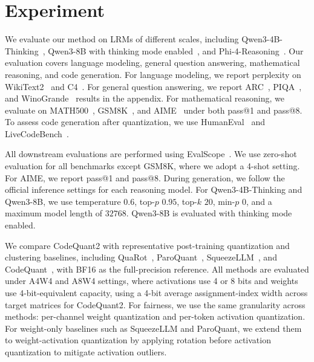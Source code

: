 \documentclass{article}
\begin{document}
\section{Experiment}
\label{sec:experiment}
We evaluate our method on LRMs of different scales, including Qwen3-4B-Thinking~\citep{yang2025qwen3}, Qwen3-8B with thinking mode enabled~\citep{yang2025qwen3}, and Phi-4-Reasoning~\citep{abdin2025phi4reasoningtechnicalreport}. Our evaluation covers language modeling, general question answering, mathematical reasoning, and code generation. For language modeling, we report perplexity on WikiText2~\citep{merity2016pointersentinelmixturemodels} and C4~\citep{raffel2023exploringlimitstransferlearning}. For general question answering, we report ARC~\citep{clark2018thinksolvedquestionanswering}, PIQA~\citep{bisk2020piqa}, and WinoGrande~\citep{sakaguchi2021winogrande} results in the appendix. For mathematical reasoning, we evaluate on MATH500~\citep{hendrycks2021measuringmassivemultitasklanguage}, GSM8K~\citep{cobbe2021trainingverifierssolvemath}, and AIME~\citep{aime25,aime26} under both pass@1 and pass@8. To assess code generation after quantization, we use HumanEval~\citep{chen2021evaluating} and LiveCodeBench~\citep{jain2024livecodebenchholisticcontaminationfree}.

All downstream evaluations are performed using EvalScope~\citep{evalscope_2024}. We use zero-shot evaluation for all benchmarks except GSM8K, where we adopt a 4-shot setting. For AIME, we report pass@1 and pass@8. During generation, we follow the official inference settings for each reasoning model. For Qwen3-4B-Thinking and Qwen3-8B, we use temperature $0.6$, top-$p$ $0.95$, top-$k$ $20$, min-$p$ $0$, and a maximum model length of $32768$. Qwen3-8B is evaluated with thinking mode enabled.

We compare CodeQuant2 with representative post-training quantization and clustering baselines, including QuaRot~\citep{ashkboos2024quarotoutlierfree4bitinference}, ParoQuant~\citep{liang2025paroquant}, SqueezeLLM~\citep{kim2024squeezellmdenseandsparsequantization}, and CodeQuant~\citep{yin2026codequant}, with BF16 as the full-precision reference. All methods are evaluated under A4W4 and A8W4 settings, where activations use 4 or 8 bits and weights use 4-bit-equivalent capacity, using a 4-bit average assignment-index width across target matrices for CodeQuant2. For fairness, we use the same granularity across methods: per-channel weight quantization and per-token activation quantization. For weight-only baselines such as SqueezeLLM and ParoQuant, we extend them to weight-activation quantization by applying rotation before activation quantization to mitigate activation outliers.
\end{document}
